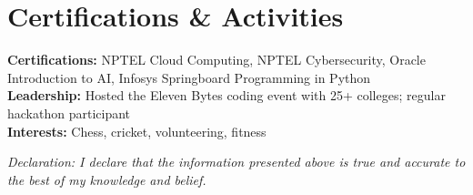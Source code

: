 \documentclass[a4paper,10pt]{article}
\begin{document}
\section*{Certifications \& Activities}
\textbf{Certifications:} NPTEL Cloud Computing, NPTEL Cybersecurity, Oracle Introduction to AI, Infosys Springboard Programming in Python\\
\textbf{Leadership:} Hosted the Eleven Bytes coding event with 25+ colleges; regular hackathon participant\\
\textbf{Interests:} Chess, cricket, volunteering, fitness

\vspace{4pt}
{\footnotesize\textit{Declaration: I declare that the information presented above is true and accurate to the best of my knowledge and belief.}}
\end{document}
